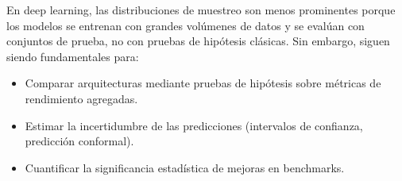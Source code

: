 \begin{observacion}
En deep learning, las distribuciones de muestreo son menos prominentes porque los
modelos se entrenan con grandes vol\'umenes de datos y se eval\'uan con conjuntos
de prueba, no con pruebas de hip\'otesis cl\'asicas. Sin embargo, siguen siendo
fundamentales para:
\begin{itemize}
 \item Comparar arquitecturas mediante pruebas de hip\'otesis sobre m\'etricas de
 rendimiento agregadas.
 \item Estimar la incertidumbre de las predicciones (intervalos de confianza,
 predicci\'on conformal).
 \item Cuantificar la significancia estad\'istica de mejoras en benchmarks.
\end{itemize}
\end{observacion}


